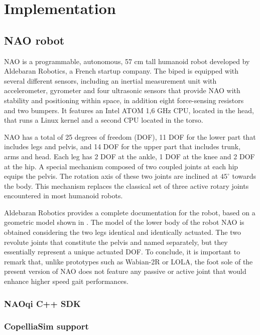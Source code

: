 \chapter{Implementation}

\section{NAO robot}


NAO is a programmable, autonomous, 57 cm tall humanoid robot developed by Aldebaran Robotics, a French startup company. The biped is equipped with several
different sensors, including an inertial measurement unit with accelerometer, gyrometer and four ultrasonic sensors that provide NAO with stability and 
positioning within space, in addition eight force-sensing resistors and two bumpers. It features an Intel ATOM 1,6 GHz CPU, located in the head, that runs
 a Linux kernel and a second CPU located in the torso.


NAO has a total of 25 degrees of freedom (DOF), 11 DOF for the lower part that includes legs and pelvis, and 14 DOF for the upper part that includes trunk, 
arms and head. Each leg has 2 DOF at the ankle, 1 DOF at the knee and 2 DOF at the hip. A special mechanism composed of two coupled joints at each hip equips 
the pelvis. The rotation axis of these two joints are inclined at $45^\circ$ towards the body. This mechanism replaces the classical set of three active rotary joints 
encountered in most humanoid robots.


Aldebaran Robotics provides a complete documentation for the robot, based on a geometric model shown in . The model of the lower body of the robot 
NAO is obtained considering the two legs identical and identically actuated. The two revolute joints that constitute the pelvis and named separately, but 
they essentially represent a unique actuated DOF. To conclude, it is important to remark that, unlike prototypes such as Wabian-2R or LOLA, the foot sole of 
the present version of NAO does not feature any passive or active joint that would enhance higher speed gait performances.


\subsection{NAOqi C++ SDK}
\subsection{CopelliaSim support}



